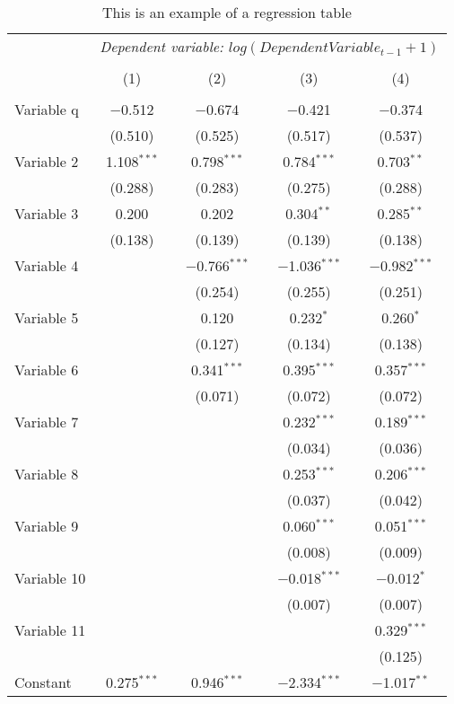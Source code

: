 \documentclass[10pt]{article}
\begin{document}
\begin{table*}[htbp!] \centering \footnotesize
  \caption{This is an example of a regression table} 
  \label{tab:regress} 
\begin{tabular}{@{\extracolsep{5pt}}lcccc} 

 & \multicolumn{4}{c}{\textsl{Dependent variable: $log(Dependent Variable_{t-1} + 1)$}} \\ 
\cline{2-5} 
\\[-1.8ex] & (1) & (2) & (3) & (4) \\ 
\hline \\[-1.8ex] 
  Variable q  & $-$0.512 & $-$0.674 & $-$0.421 & $-$0.374 \\ 
  & (0.510) & (0.525) & (0.517) & (0.537) \\ 
  Variable 2 & 1.108$^{***}$ & 0.798$^{***}$ & 0.784$^{***}$ & 0.703$^{**}$ \\ 
  & (0.288) & (0.283) & (0.275) & (0.288) \\ 
  Variable 3  & 0.200 & 0.202 & 0.304$^{**}$ & 0.285$^{**}$ \\ 
  & (0.138) & (0.139) & (0.139) & (0.138) \\ 
  Variable 4 &  & $-$0.766$^{***}$ & $-$1.036$^{***}$ & $-$0.982$^{***}$ \\ 
  &  & (0.254) & (0.255) & (0.251) \\ 
  Variable 5 &  & 0.120 & 0.232$^{*}$ & 0.260$^{*}$ \\ 
  &  & (0.127) & (0.134) & (0.138) \\ 
  Variable 6 &  & 0.341$^{***}$ & 0.395$^{***}$ & 0.357$^{***}$ \\ 
  &  & (0.071) & (0.072) & (0.072) \\  
  Variable 7 &  &  & 0.232$^{***}$ & 0.189$^{***}$ \\ 
  &  &  & (0.034) & (0.036) \\ 
  Variable 8 &  &  & 0.253$^{***}$ & 0.206$^{***}$ \\ 
  &  &  & (0.037) & (0.042) \\ 
  Variable 9 &  &  & 0.060$^{***}$ & 0.051$^{***}$ \\ 
  &  &  & (0.008) & (0.009) \\ 
  Variable 10 &  &  & $-$0.018$^{***}$ & $-$0.012$^{*}$ \\ 
  &  &  & (0.007) & (0.007) \\ 
  Variable 11 &  &  &  & 0.329$^{***}$ \\ 
  &  &  &  & (0.125) \\ 
   Constant & 0.275$^{***}$ & 0.946$^{***}$ & $-$2.334$^{***}$ & $-$1.017$^{**}$ \\ 

\end{tabular}
\end{table*}
\end{document}
